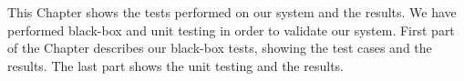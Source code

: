 This Chapter shows the tests performed on our system and the results. We have performed black-box and unit testing in order to validate our system. First part of the Chapter describes our black-box tests, showing the test cases and the results. The last part shows the unit testing and the results.